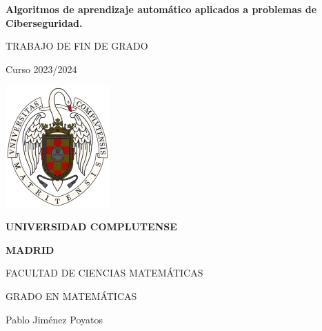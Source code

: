 \documentclass[11pt, a4paper]{article} %
\begin{document}

\begin{titlepage}
	
	\vspace*{0.8 cm}	
	
    \centering
	
	{\huge \textbf{Algoritmos de aprendizaje automático aplicados a problemas de Ciberseguridad.}\par}
    
	\vfill
	\vfill 
    
    {\LARGE \textsc{TRABAJO DE FIN DE GRADO}\par}
    
    \vspace*{0.2 cm}	 
    
    {\Large Curso 2023/2024\par}
    
    \vfill
    \vfill 
    	\vfill  
	
    \includegraphics[width=0.3\textwidth]{logo_UCM.png}\par
	
	\vfill  
    
    {\Large \textsc{\textbf{UNIVERSIDAD COMPLUTENSE}}\par}
    {\Large \textsc{\textbf{MADRID}}\par}
    
    
	\vfill   
	\vfill 
	\vfill  
	\vfill 
    
    {\Large FACULTAD DE CIENCIAS MATEMÁTICAS \par}
    
    {\Large GRADO EN MATEMÁTICAS \par}
    
    \vfill
	\vfill
	\vfill 
	\vfill 
    

    \begin{minipage}{0.75\textwidth}
        \begin{flushleft}
            {\Large Pablo Jiménez Poyatos}
        \end{flushleft}
    \end{minipage}
    

\end{titlepage}
\end{document}
